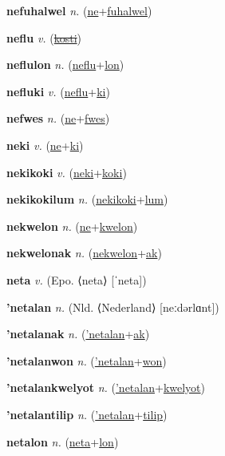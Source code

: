 \textbf{\hypertarget{nefuhalwel}{nefuhalwel}} \textit{n.} (\hyperlink{ne}{ne}+\allowbreak \hyperlink{fuhalwel}{fuhalwel})


\textbf{\hypertarget{neflu}{neflu}} \textit{v.} (\hyperlink{kosti}{\sout{kosti}})


\textbf{\hypertarget{neflulon}{neflulon}} \textit{n.} (\hyperlink{neflu}{neflu}+\allowbreak \hyperlink{lon}{lon})


\textbf{\hypertarget{nefluki}{nefluki}} \textit{v.} (\hyperlink{neflu}{neflu}+\allowbreak \hyperlink{ki}{ki})


\textbf{\hypertarget{nefwes}{nefwes}} \textit{n.} (\hyperlink{ne}{ne}+\allowbreak \hyperlink{fwes}{fwes})


\textbf{\hypertarget{neki}{neki}} \textit{v.} (\hyperlink{ne}{ne}+\allowbreak \hyperlink{ki}{ki})


\textbf{\hypertarget{nekikoki}{nekikoki}} \textit{v.} (\hyperlink{neki}{neki}+\allowbreak \hyperlink{koki}{koki})


\textbf{\hypertarget{nekikokilum}{nekikokilum}} \textit{n.} (\hyperlink{nekikoki}{nekikoki}+\allowbreak \hyperlink{lum}{lum})


\textbf{\hypertarget{nekwelon}{nekwelon}} \textit{n.} (\hyperlink{ne}{ne}+\allowbreak \hyperlink{kwelon}{kwelon})


\textbf{\hypertarget{nekwelonak}{nekwelonak}} \textit{n.} (\hyperlink{nekwelon}{nekwelon}+\allowbreak \hyperlink{ak}{ak})


\textbf{\hypertarget{neta}{neta}} \textit{v.} (Epo. ⟨neta⟩ [ˈneta])


\textbf{\hypertarget{'netalan}{'netalan}} \textit{n.} (Nld. ⟨Nederland⟩ [neːdərlɑnt])


\textbf{\hypertarget{'netalanak}{'netalanak}} \textit{n.} (\hyperlink{'netalan}{'netalan}+\allowbreak \hyperlink{ak}{ak})


\textbf{\hypertarget{'netalanwon}{'netalanwon}} \textit{n.} (\hyperlink{'netalan}{'netalan}+\allowbreak \hyperlink{won}{won})


\textbf{\hypertarget{'netalankwelyot}{'netalankwelyot}} \textit{n.} (\hyperlink{'netalan}{'netalan}+\allowbreak \hyperlink{kwelyot}{kwelyot})


\textbf{\hypertarget{'netalantilip}{'netalantilip}} \textit{n.} (\hyperlink{'netalan}{'netalan}+\allowbreak \hyperlink{tilip}{tilip})


\textbf{\hypertarget{netalon}{netalon}} \textit{n.} (\hyperlink{neta}{neta}+\allowbreak \hyperlink{lon}{lon})



